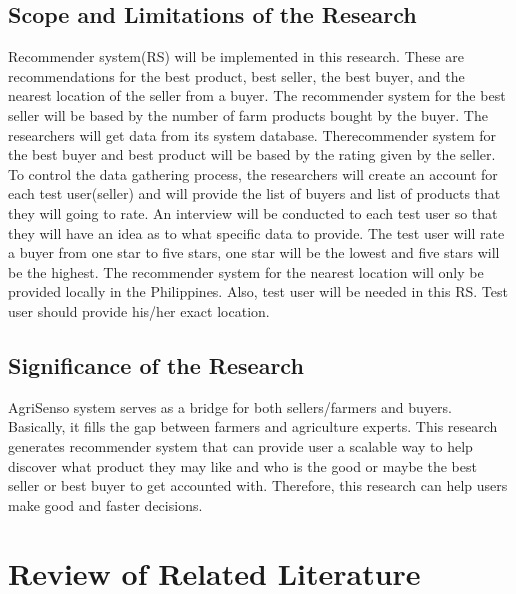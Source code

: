 \documentclass{report}
\begin{document}
\section{Scope and Limitations of the Research}
Recommender system(RS) will be implemented in this research. These are recommendations
for the best product, best seller, the best buyer, and the nearest location of the seller from a
buyer. The recommender system for the best seller will be based by the number of farm
products bought by the buyer. The researchers will get data from its system database. Therecommender system for the best buyer and best product will be based by the rating given by
the seller. To control the data gathering process, the researchers will create an account for each
test user(seller) and will provide the list of buyers and list of products that they will going to
rate. An interview will be conducted to each test user so that they will have an idea as to what
specific data to provide. The test user will rate a buyer from one star to five stars, one star will
be the lowest and five stars will be the highest. The recommender system for the nearest
location will only be provided locally in the Philippines. Also, test user will be needed in this RS.
Test user should provide his/her exact location.

\section{Significance of the Research}
AgriSenso system serves as a bridge for both sellers/farmers and buyers. Basically, it fills the
gap between farmers and agriculture experts. This research generates recommender system
that can provide user a scalable way to help discover what product they may like and who is the
good or maybe the best seller or best buyer to get accounted with. Therefore, this research can
help users make good and faster decisions.


\chapter{Review of Related Literature}
\label{chpt: Review of Related Literature}
\end{document}
